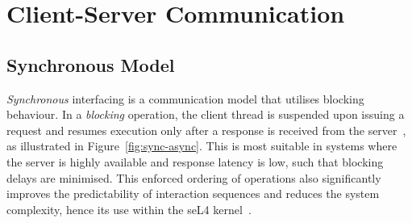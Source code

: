 \section{Client-Server Communication}

\subsection{Synchronous Model}

\textit{Synchronous} interfacing is a communication model that utilises blocking behaviour. In a \textit{blocking} operation, the client thread is suspended upon issuing a request and resumes execution only after a response is received from the server~\cite{tanenbaum_modern_2015}, as illustrated in Figure~\ref{fig:sync-async}. This is most suitable in systems where the server is highly available and response latency is low, such that blocking delays are minimised. This enforced ordering of operations also significantly improves the predictability of interaction sequences and reduces the system complexity, hence its use within the seL4 kernel~\cite{klein_sel4_2009}.

